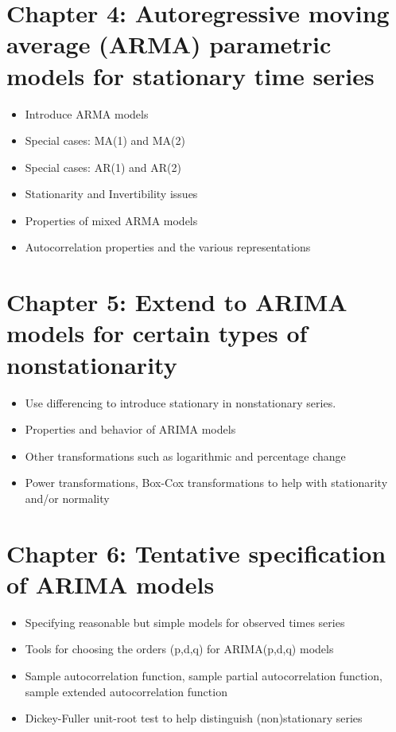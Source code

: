\documentclass[12pt]{article}
\begin{document}
\section*{Chapter 4: Autoregressive moving average (ARMA) parametric models for stationary time series}
\label{sec-4}

\begin{itemize}
\item Introduce ARMA models
\item Special cases: MA(1) and MA(2)
\item Special cases: AR(1) and AR(2)
\item Stationarity and Invertibility issues
\item Properties of mixed ARMA models
\item Autocorrelation properties and the various representations
\end{itemize}
\section*{Chapter 5: Extend to ARIMA models for certain types of nonstationarity}
\label{sec-5}

\begin{itemize}
\item Use differencing to introduce stationary in nonstationary series.
\item Properties and behavior of ARIMA models
\item Other transformations such as logarithmic and percentage change
\item Power transformations, Box-Cox transformations to help with stationarity and/or normality
\end{itemize}
\section*{Chapter 6: Tentative specification of ARIMA models}
\label{sec-6}

\begin{itemize}
\item Specifying reasonable but simple models for observed times series
\item Tools for choosing the orders (p,d,q) for ARIMA(p,d,q) models
\item Sample autocorrelation function, sample partial autocorrelation function, sample extended autocorrelation function
\item Dickey-Fuller unit-root test to help distinguish (non)stationary series
\end{itemize}
\end{document}
